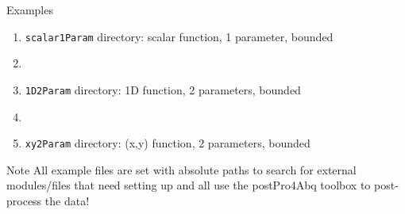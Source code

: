 \begin{frame}{Examples}
\vfill

\begin{enumerate}
\item \texttt{scalar1Param} directory:  scalar function, 1 parameter, bounded
\item[]
\item \texttt{1D2Param} directory: 1D function, 2 parameters, bounded
\item[]
\item \texttt{xy2Param} directory: (x,y) function, 2 parameters, bounded
\end{enumerate}
\vfill
\begin{block}{Note}
All example files are set with absolute paths to search for external modules/files that need setting up and all use the postPro4Abq toolbox to post-process the data!
\end{block}
\end{frame}